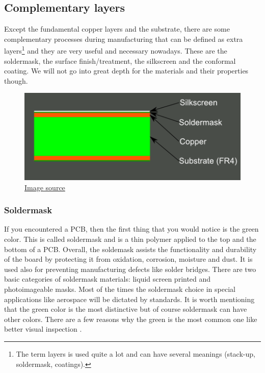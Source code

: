 \documentclass[final]{cubedoc}
\begin{document}
	\subsection{Complementary layers}
	\label{subsec:complementary}
	
	Except the fundamental copper layers and the substrate, there are some complementary processes during manufacturing that can be defined as extra layers\footnote{The term layers is used quite a lot and can have several meanings (stack-up, soldermask, coatings).} and they are very useful and necessary nowadays. These are the soldermask, the surface finish/treatment, the silkscreen and the conformal coating. We will not go into great depth for the materials and their properties though.
	
	\begin{figure}[h!]
		\centering
		\centering
		\includegraphics[keepaspectratio, height=0.25\textheight, width=.6\textwidth]{assets/2_layer_plus_silkscreen.png}
		\caption{\href{https://web.archive.org/web/20200814083524/https://learn.sparkfun.com/tutorials/using-eagle-board-layout/all}{Image source}}
	\end{figure}
	
	
	
	\subsubsection{Soldermask}
	
	If you encountered a PCB, then the first thing that you would notice is the green color. This is called soldermask and is a thin polymer applied to the top and the bottom of a PCB. Overall, the soldemask assists the functionality and durability of the board by protecting it from oxidation, corrosion, moisture and dust. It is used also for preventing manufacturing defects like solder bridges.  There are two basic categories of soldermask materials: liquid screen printed and photoimageable masks. Most of the times the soldermask choice in special applications like aerospace will be dictated by standards. It is worth mentioning that the green color is the most distinctive but of course soldermask can have other colors. There are a few reasons why the green is the most common one like better visual inspection \cite{mitzner2011complete}.
	
\end{document}

